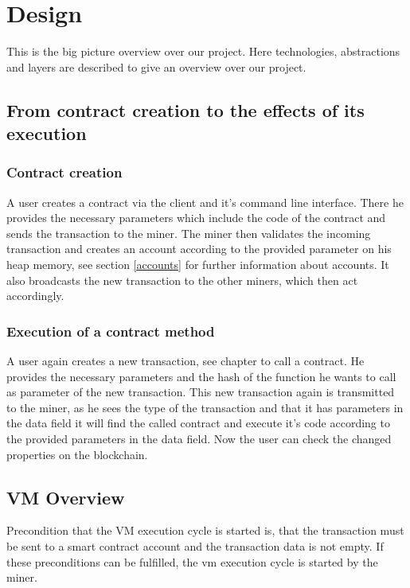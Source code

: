 \chapter{Design}
\thispagestyle{main} %
This is the big picture overview over our project. Here technologies, abstractions and layers are described to give an overview over our project.

\section{From contract creation to the effects of its execution}
\subsection{Contract creation}
A user creates a contract via the client and it's command line interface. There he provides the necessary parameters which include the code of the contract and sends the transaction to the miner. The miner then validates the incoming transaction and creates an account according to the provided parameter on his heap memory, see section \ref{accounts} for further information about accounts. It also broadcasts the new transaction to the other miners, which then act accordingly.

\subsection{Execution of a contract method}
A user again creates a new transaction, see chapter  to call a contract. He provides the necessary parameters and the hash of the function he wants to call as parameter of the new transaction. This new transaction again is transmitted to the miner, as he sees the type of the transaction and that it has parameters in the data field it will find the called contract and execute it's code according to the provided parameters in the data field. Now the user can check the changed properties on the blockchain. 
\pagebreak

\section{VM Overview}
Precondition that the VM execution cycle is started is, that the transaction must be sent to a smart contract account and the transaction data is not empty. If these preconditions can be fulfilled, the vm execution cycle is started by the miner.

